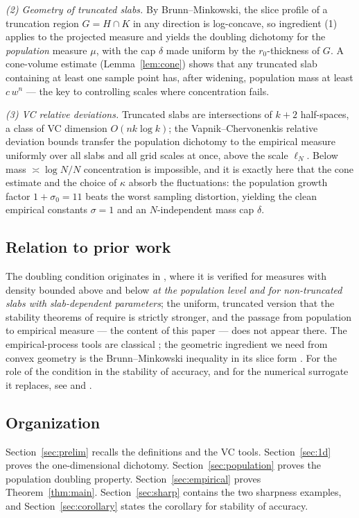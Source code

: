 \documentclass[11pt]{article}
\begin{document}
\emph{(2) Geometry of truncated slabs.}  By Brunn--Minkowski, the slice profile of a
truncation region $G=H\cap K$ in any direction is log-concave, so ingredient (1)
applies to the projected measure and yields the doubling dichotomy for the
\emph{population} measure $\mu$, with the cap $\delta$ made uniform by the
$r_0$-thickness of $G$.  A cone-volume estimate (Lemma~\ref{lem:cone}) shows that any
truncated slab containing at least one sample point has, after widening, population
mass at least $c\,w^n$ --- the key to controlling scales where concentration fails.

\emph{(3) VC relative deviations.}  Truncated slabs are intersections of $k+2$
half-spaces, a class of VC dimension $O(nk\log k)$; the
Vapnik--Chervonenkis relative deviation bounds transfer the population dichotomy to
the empirical measure uniformly over all slabs and all grid scales at once, above the
scale $\ell_N$.  Below mass $\asymp\log N/N$ concentration is impossible, and it is
exactly here that the cone estimate and the choice of $\kappa$ absorb the
fluctuations: the population growth factor $1+\sigma_0=11$ beats the worst sampling
distortion, yielding the clean empirical constants $\sigma=1$ and an
$N$-independent mass cap $\delta$.

\subsection*{Relation to prior work}

The doubling condition originates in \cite{BJS}, where it is verified for measures
with density bounded above and below \emph{at the population level and for
non-truncated slabs with slab-dependent parameters}; the uniform, truncated version
that the stability theorems of \cite{ShmaloUDC} require is strictly stronger, and the
passage from population to empirical measure --- the content of this paper --- does
not appear there.  The empirical-process tools are classical
\cite{VC71,Vapnik,BEHW,AnthonyBartlett}; the geometric ingredient we need from convex
geometry is the Brunn--Minkowski inequality in its slice form
\cite{Gardner}.  For the role of the condition in the stability of accuracy, and for
the numerical surrogate it replaces, see \cite[Sections 3--5]{ShmaloUDC} and
\cite{BJS2}.

\subsection*{Organization}
Section~\ref{sec:prelim} recalls the definitions and the VC tools.
Section~\ref{sec:1d} proves the one-dimensional dichotomy.
Section~\ref{sec:population} proves the population doubling property.
Section~\ref{sec:empirical} proves Theorem~\ref{thm:main}.
Section~\ref{sec:sharp} contains the two sharpness examples, and
Section~\ref{sec:corollary} states the corollary for stability of accuracy.
\end{document}
